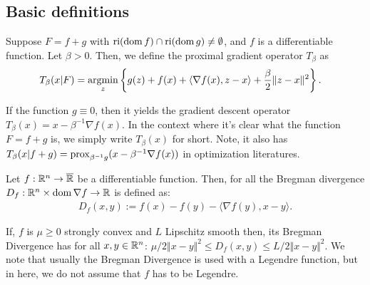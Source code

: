 \documentclass[12pt]{article}
\begin{document}
    \subsection{Basic definitions}
        \begin{definition}\label{def:pg-opt}
            Suppose $F = f + g$ with $\operatorname{ri}(\operatorname{dom} f) \cap \operatorname{ri}(\operatorname{dom} g) \neq \emptyset$, and $f$ is a differentiable function. 
            Let $\beta > 0$. 
            Then, we define the proximal gradient operator $T_{\beta}$ as 
            \begin{align*}
                T_\beta (x | F) &= \mathop{\rm argmin}\limits_{z} \left\lbrace
                    g(z) + f(x) + \langle \nabla f(x), z - x\rangle + \frac{\beta}{2}\Vert z - x\Vert^2
                \right\rbrace. 
            \end{align*}
        \end{definition}
        \begin{remark}
            If the function $g \equiv 0$, then it yields the gradient descent operator $T_\beta(x) = x - \beta^{-1}\nabla f(x)$. 
            In the context where it's clear what the function $F = f + g$ is, we simply write $T_\beta(x)$ for short. 
            Note, it also has $T_\beta(x | f + g) = \operatorname{prox}_{\beta^{-1}g}(x - \beta^{-1}\nabla f(x))$ in optimization literatures. 
        \end{remark}
        \begin{definition}
            Let $f:\mathbb R^n \rightarrow \overline {\mathbb R}$ be a differentiable function. 
            Then, for all the Bregman divergence $D_f: \mathbb R^n \times \operatorname{dom}\nabla f \rightarrow \mathbb R$ is defined as: 
            \begin{align*}
                D_f(x, y) := f(x) - f(y) - \langle \nabla f(y), x - y\rangle. 
            \end{align*}
        \end{definition}
        \begin{remark}
            If, $f$ is $\mu \ge 0$ strongly convex and $L$ Lipschitz smooth then, its Bregman Divergence has for all $x, y \in \mathbb R^n$: $\mu/2 \Vert x - y\Vert^2 \le D_f(x, y) \le L/2 \Vert x - y\Vert^2$. 
            We note that usually the Bregman Divergence is used with a Legendre function, but in here, we do not assume that $f$ has to be Legendre. 
        \end{remark}
\end{document}
